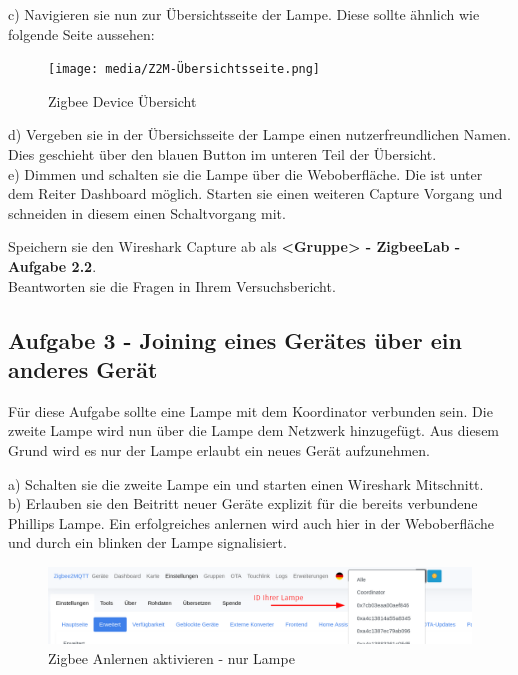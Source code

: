 c) Navigieren sie nun zur Übersichtsseite der Lampe. Diese sollte ähnlich wie folgende Seite aussehen:

\begin{figure}[H]
    \centering
    \texttt{[image: media/Z2M-Übersichtsseite.png]}
    \caption{Zigbee Device Übersicht}
\end{figure}

d) Vergeben sie in der Übersichsseite der Lampe einen nutzerfreundlichen Namen. Dies geschieht über den blauen Button im unteren Teil der Übersicht.\\
e) Dimmen und schalten sie die Lampe über die Weboberfläche. Die ist unter dem Reiter \grqq Dashboard\grqq{} möglich. Starten sie einen weiteren Capture Vorgang und
schneiden in diesem einen Schaltvorgang mit.

\begin{Aufgabe}
    Speichern sie den Wireshark Capture ab als \textbf{\grqq <Gruppe> - ZigbeeLab - Aufgabe 2.2\grqq{}}. \\
    Beantworten sie die Fragen in Ihrem Versuchsbericht.
\end{Aufgabe}

\subsection{Aufgabe 3 - Joining eines Gerätes über ein anderes Gerät}
Für diese Aufgabe sollte eine Lampe mit dem Koordinator verbunden sein. Die zweite Lampe wird nun über die Lampe dem Netzwerk hinzugefügt. Aus diesem Grund wird es nur der Lampe
erlaubt ein neues Gerät aufzunehmen. 

a) Schalten sie die zweite Lampe ein und starten einen Wireshark Mitschnitt.\\
b) Erlauben sie den Beitritt neuer Geräte explizit für die bereits verbundene Phillips Lampe.
Ein erfolgreiches anlernen wird auch hier in der Weboberfläche und durch ein blinken der Lampe signalisiert. 

\begin{figure}[H]
    \centering
    \includegraphics[width=1\textwidth]{media/Z2M-Anlernen-Lampe.png}
    \caption{Zigbee Anlernen aktivieren - nur Lampe}
\end{figure}

